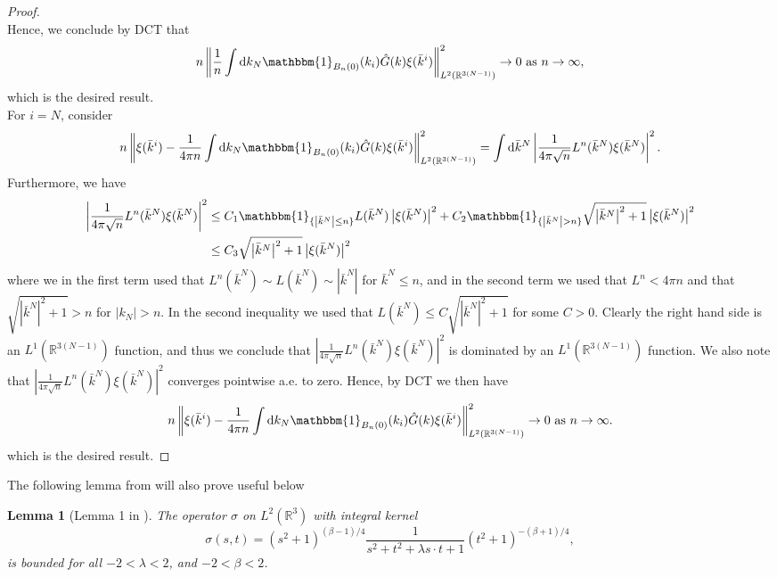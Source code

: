 \documentclass[a4paper,11pt]{article}
\newcommand{\norm}[1]{\left\lVert #1 \right\rVert}
\newcommand{\abs}[1]{\left\lvert #1 \right\rvert}
\newcommand*\diff{\mathop{}\!\mathrm{d}}
\newcommand{\R}{\mathbb{R}}
\newtheorem{lemma}{Lemma}
\numberwithin{equation}{section}
\begin{document}
\begin{proof}
\begin{equation}
	\end{equation}
	Hence, we conclude by DCT that \begin{equation}
	n\norm{\frac{1}{n}\int \diff k_N \mathbbm{1}_{B_n(0)}(k_i)\hat{G}(k)\xi(\bar{k}^i)}^2_{L^{2}(\R^{3(N-1)})}\to0\text{ as }n\to\infty,
	\end{equation}
	which is the desired result.\\
	For $ i=N $, consider\begin{equation}
	\begin{aligned}
	n\norm{\xi(\bar{k}^i)-\frac{1}{4\pi n}\int \diff k_N \mathbbm{1}_{B_n(0)}(k_i)\hat{G}(k)\xi(\bar{k}^i)}^2_{L^2(\R^{3(N-1)})} =\int\diff \bar{k}^N\abs{\frac{1}{4\pi \sqrt{n}}L^n(\bar{k}^N)\xi(\bar{k}^N)}^2.
	\end{aligned}
	\end{equation}
	Furthermore, we have
	\begin{equation}\label{EqLbound}
	\begin{aligned}
	\abs{\frac{1}{4\pi \sqrt{n}}L^n(\bar{k}^N)\xi(\bar{k}^N)}^2&\leq C_1\mathbbm{1}_{\{\abs{\bar{k}^N}\leq n\}} L(\bar{k}^N)\abs{\xi(\bar{k}^N)}^2+C_2\mathbbm{1}_{\{\abs{\bar{k}^N}>n\}}\sqrt{\abs{\bar{k}^N}^2+1}\abs{\xi(\bar{k}^N)}^2\\
	&\leq C_3\sqrt{\abs{\bar{k}^N}^2+1}\abs{\xi(\bar{k}^N)}^2
	\end{aligned}
	\end{equation}
	where we in the first term used that $ L^n(\bar{k}^N)\sim L(\bar{k}^N)\sim \abs{\bar{k}^N} $ for $ \bar{k}^N\leq n $, and in the second term we used that $ L^n<4\pi n $ and that $ \sqrt{\abs{\bar{k}^N}^2+1}>n $ for $ \abs{k_N}>n $. In the second inequality we used that $ L(\bar{k}^N)\leq C\sqrt{\abs{\bar{k}^N}^2+1} $ for some $ C>0 $. Clearly the right hand side is an $ L^1(\R^{3(N-1)}) $ function, and thus we conclude that $ \abs{\frac{1}{4\pi \sqrt{n}}L^n(\bar{k}^N)\xi(\bar{k}^N)}^2 $ is dominated by an $ L^1(\R^{3(N-1)}) $ function. We also note that $ \abs{\frac{1}{4\pi \sqrt{n}}L^n(\bar{k}^N)\xi(\bar{k}^N)}^2 $ converges pointwise a.e. to zero. Hence, by DCT we then have \begin{equation}
		n\norm{\xi(\bar{k}^i)-\frac{1}{4\pi n}\int \diff k_N \mathbbm{1}_{B_n(0)}(k_i)\hat{G}(k)\xi(\bar{k}^i)}^2_{L^2(\R^{3(N-1)})}\to0\text{ as }n\to\infty.
	\end{equation}
	which is the desired result.
\end{proof}
The following lemma from \cite{Moser_2017} will also prove useful below\begin{lemma}[Lemma 1 in \cite{Moser_2017}]\label{lemmaMoserSeiringer}
	The operator $ \sigma $ on $ L^2(\R^3) $ with integral kernel\begin{equation}
	\sigma(s,t)=(s^2+1)^{(\beta-1)/4}\frac{1}{s^2+t^2+\lambda s\cdot t+1}(t^2+1)^{-(\beta+1)/4},
	\end{equation}
	is bounded for all $ -2<\lambda<2 $, and $ -2<\beta<2 $.
\end{lemma}
\end{document}
